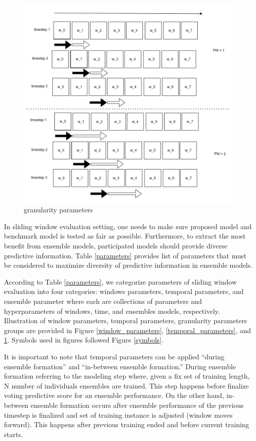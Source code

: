 \documentclass{IEEEtran}
\begin{document}
\begin{figure}[htbp]
\centering
\includegraphics[width=.9\linewidth]{./images/screenshot_20220321_130720.png}
\caption{\label{granularity_parameters}granularity parameters}
\end{figure}


In sliding window evaluation setting, one needs to make sure proposed model and benchmark model is tested as fair as possible. Furthermore, to extract the most benefit from ensemble models, participated models should provide diverse predictive information. Table \ref{parameters} provides list of parameters that must be considered to maximize diversity of predictive information in ensemble models.

According to Table \ref{parameters}, we categorize parameters of sliding window evaluation into four categories: windows parameters, temporal parameters, and ensemble parameter where each are collections of parameters and hyperparameters of windows, time, and ensembles models, respectively. Illustration of window parameters, temporal parameters, granularity parameters groups are provided in Figure \ref{window_parameters}, \ref{temporal_parameters}, and \ref{granularity_parameters}. Symbols used in figures followed Figure \ref{symbols}.

It is important to note that temporal parameters can be applied ``during ensemble formation'' and ``in-between ensemble formation.'' During ensemble formation referring to the modeling step where, given a fix set of training length, N number of individuals ensembles are trained. This step happens before finalize voting predictive score for an ensemble performance. On the other hand, in-between ensemble formation occurs after ensemble performance of the previous timestep is finalized and set of training instance is adjusted (window moves forward). This happens after previous training ended and before current training starts.
\end{document}

